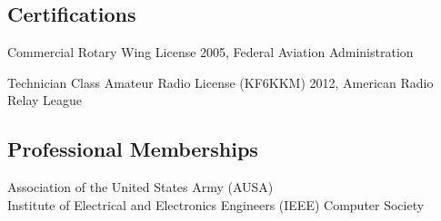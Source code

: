 \documentclass[12pt,letterpaper]{article}
\begin{document}
\subsection{Certifications}
Commercial Rotary Wing License 2005, Federal Aviation Administration

Technician Class Amateur Radio License (KF6KKM) 2012, American Radio Relay League

\subsection{Professional Memberships}
Association of the United States Army (AUSA)\\
Institute of Electrical and Electronics Engineers (IEEE) Computer Society
\end{document}
